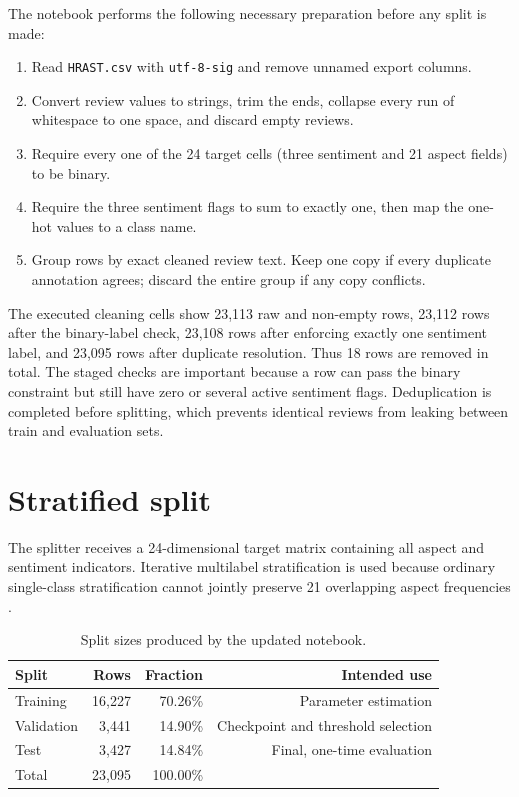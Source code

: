 \documentclass[11pt,a4paper]{report}
\newcommand{\code}[1]{\texttt{#1}}
\begin{document}
The notebook performs the following necessary preparation before any split is made:
\begin{enumerate}[leftmargin=*]
  \item Read \code{HRAST.csv} with \code{utf-8-sig} and remove unnamed export columns.
  \item Convert review values to strings, trim the ends, collapse every run of whitespace to one space, and discard empty reviews.
  \item Require every one of the 24 target cells (three sentiment and 21 aspect fields) to be binary.
  \item Require the three sentiment flags to sum to exactly one, then map the one-hot values to a class name.
  \item Group rows by exact cleaned review text.  Keep one copy if every duplicate annotation agrees; discard the entire group if any copy conflicts.
\end{enumerate}

The executed cleaning cells show 23,113 raw and non-empty rows, 23,112 rows after the binary-label check, 23,108 rows after enforcing exactly one sentiment label, and 23,095 rows after duplicate resolution.  Thus 18 rows are removed in total.  The staged checks are important because a row can pass the binary constraint but still have zero or several active sentiment flags.
Deduplication is completed before splitting, which prevents identical reviews from leaking between train and evaluation sets.

\section{Stratified split}

The splitter receives a 24-dimensional target matrix containing all aspect and sentiment indicators.  Iterative multilabel stratification is used because ordinary single-class stratification cannot jointly preserve 21 overlapping aspect frequencies \cite{sechidis2011}.

\begin{table}[H]
\centering
\caption{Split sizes produced by the updated notebook.}
\label{tab:splits}
\begin{tabular}{lrrr}
\toprule
Split & Rows & Fraction & Intended use \\
\midrule
Training & 16,227 & 70.26\% & Parameter estimation \\
Validation & 3,441 & 14.90\% & Checkpoint and threshold selection \\
Test & 3,427 & 14.84\% & Final, one-time evaluation \\
\midrule
Total & 23,095 & 100.00\% & \\
\bottomrule
\end{tabular}
\end{table}
\end{document}
